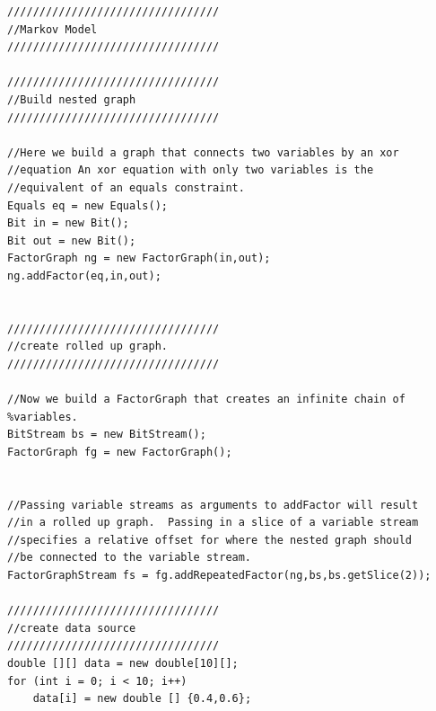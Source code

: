 \ifjava
\begin{lstlisting}
/////////////////////////////////                                                                                             
//Markov Model                                                                                                                 
/////////////////////////////////

/////////////////////////////////                                                                                             
//Build nested graph                                                                                                           
/////////////////////////////////                                                                                             

//Here we build a graph that connects two variables by an xor 
//equation An xor equation with only two variables is the 
//equivalent of an equals constraint.                                                                                                 
Equals eq = new Equals();
Bit in = new Bit();
Bit out = new Bit();
FactorGraph ng = new FactorGraph(in,out);
ng.addFactor(eq,in,out);


/////////////////////////////////                                                                                             
//create rolled up graph.                                                                                                      
/////////////////////////////////                                                                                             

//Now we build a FactorGraph that creates an infinite chain of %variables.                                                     
BitStream bs = new BitStream();
FactorGraph fg = new FactorGraph();


//Passing variable streams as arguments to addFactor will result 
//in a rolled up graph.  Passing in a slice of a variable stream 
//specifies a relative offset for where the nested graph should 
//be connected to the variable stream.                       
FactorGraphStream fs = fg.addRepeatedFactor(ng,bs,bs.getSlice(2));

/////////////////////////////////                                                                                             
//create data source                                                                                                           
/////////////////////////////////
double [][] data = new double[10][];
for (int i = 0; i < 10; i++)
	data[i] = new double [] {0.4,0.6};
		

\end{lstlisting}

